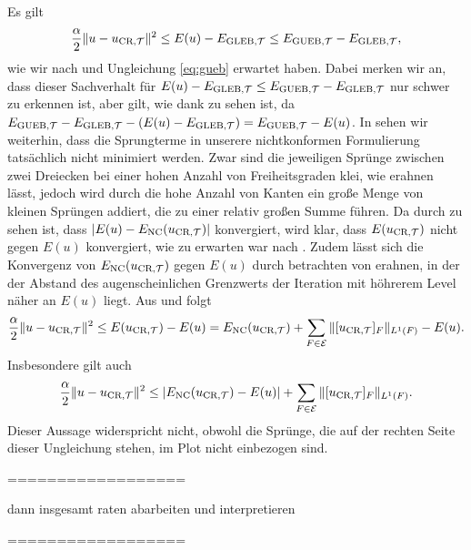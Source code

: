Es gilt 
\begin{align}
  \label{eq:expectedInequalities}
  \frac{\alpha}{2}\Vert u -u_{\textup{CR}, \mathcal{T}}\Vert^2
  \leq
  E(u)-E_{\textup{GLEB}, \mathcal{T}}
  \leq
  E_{\textup{GUEB}, \mathcal{T}}-E_{\textup{GLEB}, \mathcal{T}},
\end{align}
wie wir nach  und Ungleichung \ref{eq:gueb} erwartet haben.
Dabei merken wir an, dass dieser Sachverhalt für $E(u)-E_{\textup{GLEB}, \mathcal{T}}\leq E_{\textup{GUEB}, \mathcal{T}}-E_{\textup{GLEB}, \mathcal{T}}$
nur schwer zu erkennen ist, aber gilt, wie dank  zu
sehen ist, da $E_{\textup{GUEB}, \mathcal{T}}-E_{\textup{GLEB}, \mathcal{T}}-(E(u)-E_{\textup{GLEB}, \mathcal{T}}) = E_{\textup{GUEB}, \mathcal{T}}-E(u)$.
In  sehen wir weiterhin, dass die Sprungterme in
unserere nichtkonformen Formulierung tatsächlich nicht minimiert werden. 
Zwar sind die jeweiligen Sprünge zwischen zwei Dreiecken bei einer hohen Anzahl
von Freiheitsgraden klei, wie  erahnen lässt, jedoch
wird durch die hohe Anzahl von Kanten ein große Menge von kleinen Sprüngen
addiert, die zu einer relativ großen Summe führen.
Da durch  zu sehen ist, dass $|E(u)-E_\textup{NC}(u_{\textup{CR}, \mathcal{T}})|$
konvergiert, wird klar, dass $E(u_{\textup{CR}, \mathcal{T}})$ nicht gegen $E(u)$ konvergiert, wie zu
erwarten war nach .
Zudem lässt sich die Konvergenz von $E_\textup{NC}(u_{\textup{CR}, \mathcal{T}})$ gegen $E(u)$ durch betrachten
von  erahnen, in der der Abstand des 
augenscheinlichen Grenzwerts der Iteration mit höhrerem Level näher an $E(u)$
liegt.
Aus  und  folgt
\begin{align*}
  \frac{\alpha}{2}\Vert u-u_{\textup{CR}, \mathcal{T}}\Vert^2\leq
  E(u_{\textup{CR}, \mathcal{T}})-E(u)=E_\textup{NC}(u_{\textup{CR}, \mathcal{T}})+\sum_{F\in\mathcal{E}}\Vert[u_{\textup{CR}, \mathcal{T}}]_F\Vert_{L^1(F)}-E(u).
\end{align*}
Insbesondere gilt auch 
\begin{align*}
  \frac{\alpha}{2}\Vert u-u_{\textup{CR}, \mathcal{T}}\Vert^2
  \leq
  \left|E_\textup{NC}(u_{\textup{CR}, \mathcal{T}})-E(u)\right|+
  \sum_{F\in\mathcal{E}}\Vert[u_{\textup{CR}, \mathcal{T}}]_F\Vert_{L^1(F)}.
\end{align*}
Dieser Aussage widerspricht  nicht, obwohl die Sprünge,
die auf der rechten Seite dieser Ungleichung stehen, im Plot nicht einbezogen
sind.


==================

dann insgesamt raten abarbeiten und interpretieren

==================

